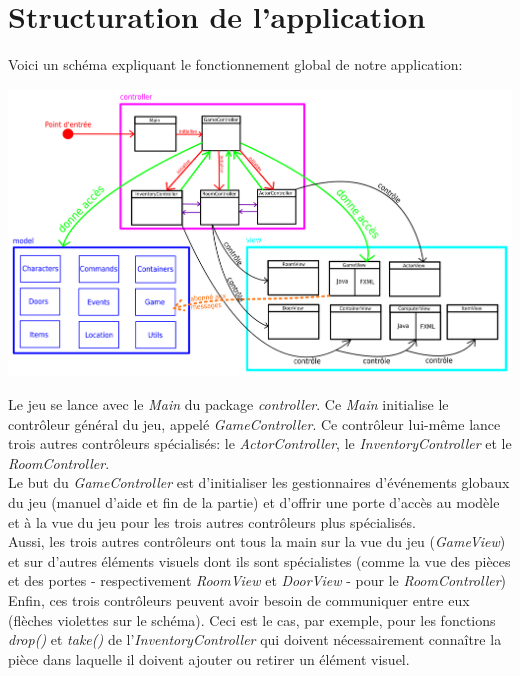 \documentclass[./standalone.tex]{subfiles}
\begin{document}
\section{Structuration de l'application}

Voici un schéma expliquant le fonctionnement global de notre application:

\begin{center}
	\includegraphics[scale=0.31]{images/structuration.png}
\end{center}

Le jeu se lance avec le \textit{Main} du package \textit{controller}. Ce \textit{Main} initialise le contrôleur général du jeu, appelé \textit{GameController}. Ce contrôleur lui-même lance trois autres contrôleurs spécialisés: le \textit{ActorController}, le \textit{InventoryController} et le \textit{RoomController}.\\

Le but du \textit{GameController} est d'initialiser les gestionnaires d'événements globaux du jeu (manuel d'aide et fin de la partie) et d'offrir une porte d'accès au modèle et à la vue du jeu pour les trois autres contrôleurs plus spécialisés.\\

Aussi, les trois autres contrôleurs ont tous la main sur la vue du jeu (\textit{GameView}) et sur d'autres éléments visuels dont ils sont spécialistes (comme la vue des pièces et des portes - respectivement \textit{RoomView} et \textit{DoorView} - pour le \textit{RoomController})\\

Enfin, ces trois contrôleurs peuvent avoir besoin de communiquer entre eux (flèches violettes sur le schéma). Ceci est le cas, par exemple, pour les fonctions \textit{drop()} et \textit{take()} de l'\textit{InventoryController} qui doivent nécessairement connaître la pièce dans laquelle il doivent ajouter ou retirer un élément visuel.\\
\end{document}
